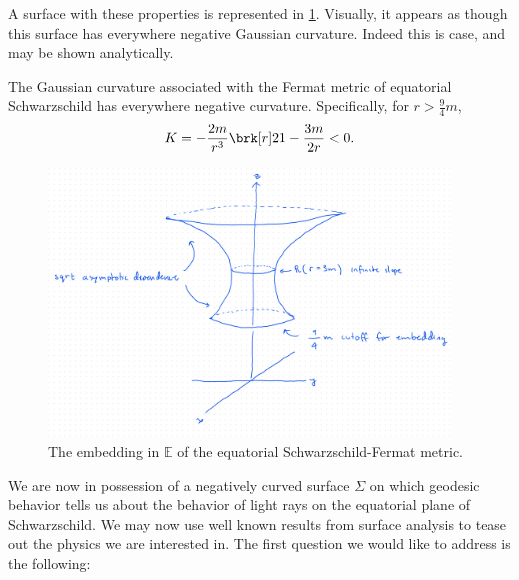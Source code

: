 %
A surface with these properties is represented in \ref{fig:embedding}.
Visually, it appears as though this surface has everywhere negative Gaussian curvature. Indeed this is case, and may be shown analytically.
\begin{proposition}[]\label{prop:neg-gauss-curve}
The Gaussian curvature associated with the Fermat metric of equatorial Schwarzschild has everywhere negative curvature. Specifically, for $r > \frac{9}{4}m$,
\begin{equation}\label{}
K = - \frac{2m}{r^3}\brk[r]2{1 - \frac{3m}{2r}} < 0.
\end{equation}
\end{proposition}
%
\begin{figure}[!htb]
	\centering
	\includegraphics[width=0.95\textwidth]{img/embedding.png}
	\caption{The embedding in $\mathbb{E}$ of the equatorial Schwarzschild-Fermat metric.}
	\label{fig:embedding}
\end{figure}

We are now in possession of a negatively curved surface $\Sigma$ on which geodesic behavior tells us about the behavior of light rays on the equatorial plane of Schwarzschild. We may now use well known results from surface analysis to tease out the physics we are interested in. The first question we would like to address is the following:
